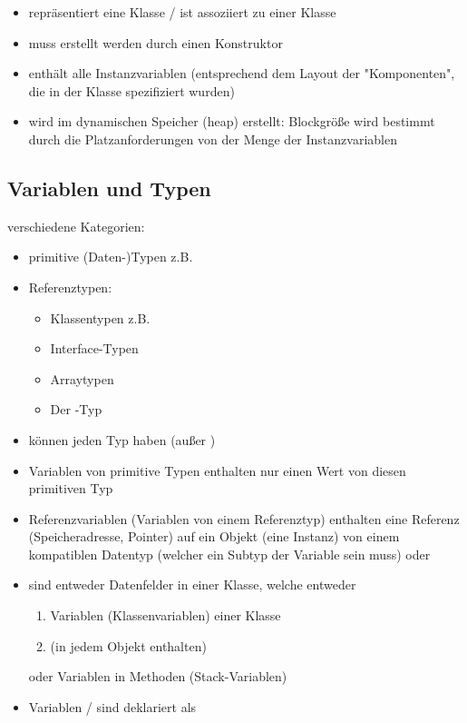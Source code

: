 \begin{itemize}
	\item repräsentiert eine Klasse / ist assoziiert zu einer Klasse
	\item muss erstellt werden durch einen Konstruktor
	\item enthält alle Instanzvariablen (entsprechend dem Layout der "Komponenten", die in der Klasse spezifiziert wurden)
	\item wird im dynamischen Speicher (heap) erstellt:
	Blockgröße wird bestimmt durch die Platzanforderungen von der Menge der Instanzvariablen
\end{itemize}

\subsection{Variablen und Typen}

 verschiedene Kategorien:
\begin{itemize}
	\item primitive (Daten-)Typen z.B. 
	\item Referenztypen:
	\begin{itemize}
		\item Klassentypen z.B. 
		\item Interface-Typen
		\item Arraytypen
		\item Der -Typ
	\end{itemize}
\end{itemize}

\begin{itemize}
	\item können jeden Typ haben (außer )
	\item Variablen von primitive Typen enthalten nur einen Wert von diesen primitiven Typ
	\item Referenzvariablen (Variablen von einem Referenztyp) enthalten eine Referenz\\ (Speicheradresse, Pointer) auf ein Objekt (eine Instanz) von einem kompatiblen Datentyp (welcher ein Subtyp der Variable sein muss) oder 
	\item sind entweder Datenfelder in einer Klasse, welche entweder 
	\begin{enumerate}[label=(\alph*)]
		\item {} Variablen (Klassenvariablen) einer Klasse
		\item {} (in jedem Objekt enthalten)
	\end{enumerate}
	oder  Variablen in Methoden (Stack-Variablen)
	\item {} Variablen /  sind deklariert als 
\end{itemize}

